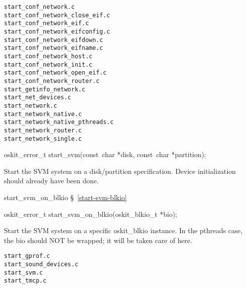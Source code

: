 
\begin{verbatim}
start_conf_network.c
start_conf_network_close_eif.c
start_conf_network_eif.c
start_conf_network_eifconfig.c
start_conf_network_eifdown.c
start_conf_network_eifname.c
start_conf_network_host.c
start_conf_network_init.c
start_conf_network_open_eif.c
start_conf_network_router.c
start_getinfo_network.c
start_net_devices.c
start_network.c
start_network_native.c
start_network_native_pthreads.c
start_network_router.c
start_network_single.c
\end{verbatim}


\label{start-svm}
\begin{apisyn}

	\funcproto oskit_error_t start_svm(const~char *disk,
					const~char *partition);
\end{apisyn}
\begin{apidesc}
	Start the SVM system on a disk/partition specification.
	Device initialization should already have been done.
\end{apidesc}
\begin{apidep}
	\item[start_svm_on_blkio]	\S~\ref{start-svm-blkio}
\end{apidep}

\label{start-svm-blkio}
\begin{apisyn}

	\funcproto oskit_error_t start_svm_on_blkio(oskit_blkio_t *bio);
\end{apisyn}
\begin{apidesc}
	Start the SVM system on a specific oskit_blkio instance.
	In the pthreads case, the bio should NOT be wrapped;
	it will be taken care of here.
\end{apidesc}

\begin{verbatim}
start_gprof.c
start_sound_devices.c
start_svm.c
start_tmcp.c
\end{verbatim}
